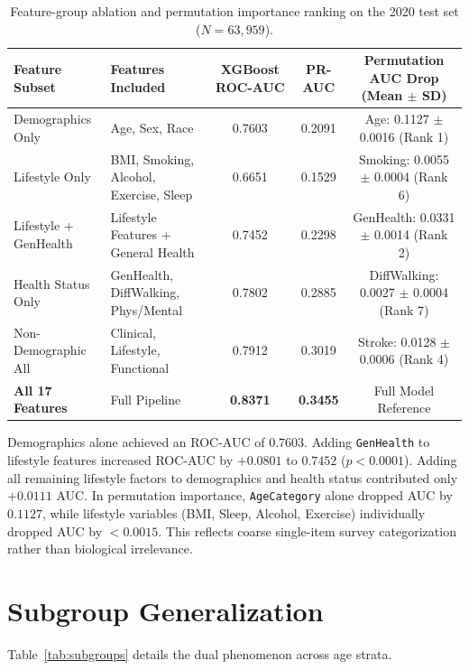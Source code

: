 \documentclass[11pt,a4paper]{article}
\begin{document}
\begin{table}[htbp]
\centering
\small
\caption{Feature-group ablation and permutation importance ranking on the 2020 test set ($N = 63,959$).}
\label{tab:ablation}
\begin{tabular}{llccc}
\toprule
Feature Subset & Features Included & XGBoost ROC-AUC & PR-AUC & Permutation AUC Drop (Mean $\pm$ SD) \\
\midrule
Demographics Only & Age, Sex, Race & 0.7603 & 0.2091 & Age: 0.1127 $\pm$ 0.0016 (Rank 1) \\
Lifestyle Only & BMI, Smoking, Alcohol, Exercise, Sleep & 0.6651 & 0.1529 & Smoking: 0.0055 $\pm$ 0.0004 (Rank 6) \\
Lifestyle + GenHealth & Lifestyle Features + General Health & 0.7452 & 0.2298 & GenHealth: 0.0331 $\pm$ 0.0014 (Rank 2) \\
Health Status Only & GenHealth, DiffWalking, Phys/Mental & 0.7802 & 0.2885 & DiffWalking: 0.0027 $\pm$ 0.0004 (Rank 7) \\
Non-Demographic All & Clinical, Lifestyle, Functional & 0.7912 & 0.3019 & Stroke: 0.0128 $\pm$ 0.0006 (Rank 4) \\
\textbf{All 17 Features} & Full Pipeline & \textbf{0.8371} & \textbf{0.3455} & Full Model Reference \\
\bottomrule
\end{tabular}
\end{table}

Demographics alone achieved an ROC-AUC of $0.7603$. Adding \texttt{GenHealth} to lifestyle features increased ROC-AUC by $+0.0801$ to $0.7452$ ($p < 0.0001$). Adding all remaining lifestyle factors to demographics and health status contributed only $+0.0111$ AUC. In permutation importance, \texttt{AgeCategory} alone dropped AUC by $0.1127$, while lifestyle variables (BMI, Sleep, Alcohol, Exercise) individually dropped AUC by $<0.0015$. This reflects coarse single-item survey categorization rather than biological irrelevance.

\section{Subgroup Generalization}

Table~\ref{tab:subgroups} details the dual phenomenon across age strata.
\end{document}
